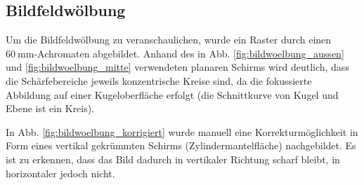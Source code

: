 \subsection{Bildfeldwölbung}

Um die Bildfeldwölbung zu veranschaulichen, wurde ein Raster durch einen $\SI{60}{\milli\meter}$-Achromaten abgebildet. Anhand des in Abb. \ref{fig:bildwoelbung_aussen} und \ref{fig:bildwoelbung_mitte} verwendeten planaren Schirms wird deutlich, dass die Schärfebereiche jeweils konzentrische Kreise sind, da die fokussierte Abbildung auf einer Kugeloberfläche erfolgt (die Schnittkurve von Kugel und Ebene ist ein Kreis). 

In Abb. \ref{fig:bildwoelbung_korrigiert} wurde manuell eine Korrekturmöglichkeit in Form eines vertikal gekrümmten Schirms (Zylindermantelfläche) nachgebildet. Es ist zu erkennen, dass das Bild dadurch in vertikaler Richtung scharf bleibt, in horizontaler jedoch nicht.

